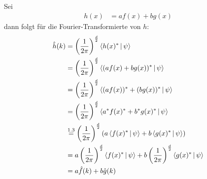 \documentclass[a4paper,11pt]{article}
\begin{document}
\subsection{}
\subsubsection{}

Sei
\begin{align}
    h(x) &= af(x) + bg(x)
\end{align}
dann folgt für die Fourier-Transformierte von $h$:
\begin{align}
\begin{split}
    \hat{h}(k) &= \left(\frac{1}{2\pi} \right)^{\frac{d}{2}} \Braket{ h(x)^* | \psi} \\
               &= \left(\frac{1}{2\pi} \right)^{\frac{d}{2}} \Braket{ (af(x)+bg(x))^* | \psi} \\
               &= \left(\frac{1}{2\pi} \right)^{\frac{d}{2}} \Braket{ (af(x))^*+(bg(x))^* | \psi} \\
               &= \left(\frac{1}{2\pi} \right)^{\frac{d}{2}} \Braket{ a^*f(x)^*+b^*g(x)^* | \psi} \\
               &\overset{1.3}{=} \left(\frac{1}{2\pi} \right)^{\frac{d}{2}} \left( a \Braket{ f(x)^* | \psi} + b \Braket{ g(x)^* | \psi} \right) \\
               &= a \left(\frac{1}{2\pi} \right)^{\frac{d}{2}} \Braket{ f(x)^* | \psi} + b \left(\frac{1}{2\pi} \right)^{\frac{d}{2}} \Braket{ g(x)^* | \psi} \\
               &= a\hat{f}(k) + b\hat{g}(k)
\end{split}
\end{align}

\subsubsection{}
\end{document}
